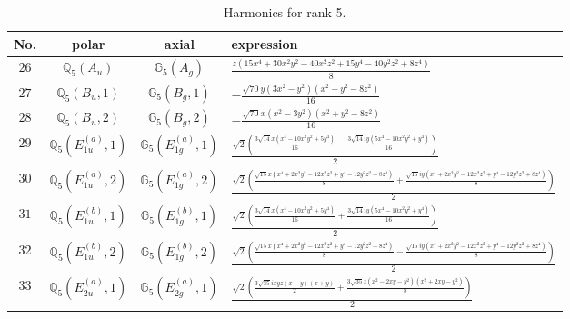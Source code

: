 \documentclass[fleqn,8pt,landscape]{jsarticle}
\begin{document}
\begin{table}[ht!]
\begin{center}
\caption{Harmonics for rank 5.}
\renewcommand{\arraystretch}{1.3}
\begin{tabular}{cccl} \hline \hline
No. & polar & axial & expression \\ \hline
$ 26 $ & $ \mathbb{Q}_{5}(A_{u}) $ & $ \mathbb{G}_{5}(A_{g}) $ & $ \frac{z \left(15 x^{4} + 30 x^{2} y^{2} - 40 x^{2} z^{2} + 15 y^{4} - 40 y^{2} z^{2} + 8 z^{4}\right)}{8} $ \\
$ 27 $ & $ \mathbb{Q}_{5}(B_{u},1) $ & $ \mathbb{G}_{5}(B_{g},1) $ & $ - \frac{\sqrt{70} y \left(3 x^{2} - y^{2}\right) \left(x^{2} + y^{2} - 8 z^{2}\right)}{16} $ \\
$ 28 $ & $ \mathbb{Q}_{5}(B_{u},2) $ & $ \mathbb{G}_{5}(B_{g},2) $ & $ - \frac{\sqrt{70} x \left(x^{2} - 3 y^{2}\right) \left(x^{2} + y^{2} - 8 z^{2}\right)}{16} $ \\
$ 29 $ & $ \mathbb{Q}_{5}(E_{1u}^{(a)},1) $ & $ \mathbb{G}_{5}(E_{1g}^{(a)},1) $ & $ \frac{\sqrt{2} \left(\frac{3 \sqrt{14} x \left(x^{4} - 10 x^{2} y^{2} + 5 y^{4}\right)}{16} - \frac{3 \sqrt{14} i y \left(5 x^{4} - 10 x^{2} y^{2} + y^{4}\right)}{16}\right)}{2} $ \\
$ 30 $ & $ \mathbb{Q}_{5}(E_{1u}^{(a)},2) $ & $ \mathbb{G}_{5}(E_{1g}^{(a)},2) $ & $ \frac{\sqrt{2} \left(\frac{\sqrt{15} x \left(x^{4} + 2 x^{2} y^{2} - 12 x^{2} z^{2} + y^{4} - 12 y^{2} z^{2} + 8 z^{4}\right)}{8} + \frac{\sqrt{15} i y \left(x^{4} + 2 x^{2} y^{2} - 12 x^{2} z^{2} + y^{4} - 12 y^{2} z^{2} + 8 z^{4}\right)}{8}\right)}{2} $ \\
$ 31 $ & $ \mathbb{Q}_{5}(E_{1u}^{(b)},1) $ & $ \mathbb{G}_{5}(E_{1g}^{(b)},1) $ & $ \frac{\sqrt{2} \left(\frac{3 \sqrt{14} x \left(x^{4} - 10 x^{2} y^{2} + 5 y^{4}\right)}{16} + \frac{3 \sqrt{14} i y \left(5 x^{4} - 10 x^{2} y^{2} + y^{4}\right)}{16}\right)}{2} $ \\
$ 32 $ & $ \mathbb{Q}_{5}(E_{1u}^{(b)},2) $ & $ \mathbb{G}_{5}(E_{1g}^{(b)},2) $ & $ \frac{\sqrt{2} \left(\frac{\sqrt{15} x \left(x^{4} + 2 x^{2} y^{2} - 12 x^{2} z^{2} + y^{4} - 12 y^{2} z^{2} + 8 z^{4}\right)}{8} - \frac{\sqrt{15} i y \left(x^{4} + 2 x^{2} y^{2} - 12 x^{2} z^{2} + y^{4} - 12 y^{2} z^{2} + 8 z^{4}\right)}{8}\right)}{2} $ \\
$ 33 $ & $ \mathbb{Q}_{5}(E_{2u}^{(a)},1) $ & $ \mathbb{G}_{5}(E_{2g}^{(a)},1) $ & $ \frac{\sqrt{2} \left(\frac{3 \sqrt{35} i x y z \left(x - y\right) \left(x + y\right)}{2} + \frac{3 \sqrt{35} z \left(x^{2} - 2 x y - y^{2}\right) \left(x^{2} + 2 x y - y^{2}\right)}{8}\right)}{2} $ \\

\end{tabular}
\end{center}
\end{table}
\end{document}
